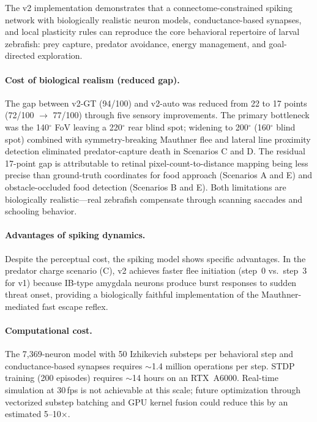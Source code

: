 \documentclass[9pt]{elife}
\begin{document}
The v2 implementation demonstrates that a connectome-constrained spiking network
with biologically realistic neuron models, conductance-based synapses, and
local plasticity rules can reproduce the core behavioral repertoire of larval zebrafish:
prey capture, predator avoidance, energy management, and goal-directed exploration.

\paragraph{Cost of biological realism (reduced gap).}
The gap between v2-GT (94/100) and v2-auto was reduced from 22 to 17 points
(72/100 $\to$ 77/100) through five sensory improvements.
The primary bottleneck was the 140$^\circ$ FoV leaving a 220$^\circ$ rear
blind spot; widening to 200$^\circ$ (160$^\circ$ blind spot) combined with
symmetry-breaking Mauthner flee and lateral line proximity detection
eliminated predator-capture death in Scenarios C and D.
The residual 17-point gap is attributable to retinal pixel-count-to-distance
mapping being less precise than ground-truth coordinates for food approach
(Scenarios A and E) and obstacle-occluded food detection (Scenarios B and E).
Both limitations are biologically realistic---real zebrafish compensate through
scanning saccades and schooling behavior.

\paragraph{Advantages of spiking dynamics.}
Despite the perceptual cost, the spiking model shows specific advantages.
In the predator charge scenario (C), v2 achieves faster flee initiation
(step~0 vs.\ step~3 for v1) because IB-type amygdala neurons produce
burst responses to sudden threat onset, providing a biologically faithful
implementation of the Mauthner-mediated fast escape reflex.

\paragraph{Computational cost.}
The 7,369-neuron model with 50 Izhikevich substeps per behavioral step
and conductance-based synapses requires $\sim$1.4 million operations per step.
STDP training (200 episodes) requires $\sim$14 hours on an RTX~A6000.
Real-time simulation at 30\,fps is not achievable at this scale;
future optimization through vectorized substep batching and GPU kernel fusion
could reduce this by an estimated 5--10$\times$.
\end{document}
